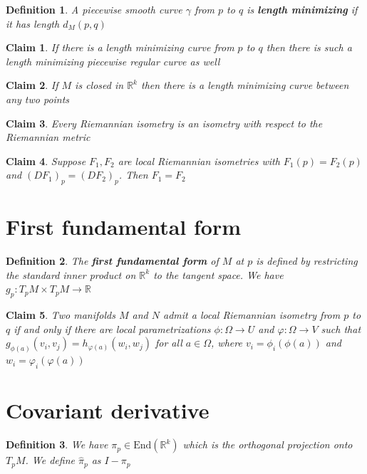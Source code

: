 \documentclass{article}
\newtheorem{definition}{Definition}
\newtheorem{claim}{Claim}
\begin{document}
\begin{definition}
    A piecewise smooth curve $\gamma$ from $p$ to $q$ is \textbf{length minimizing} if it has length $d_M(p,q)$
\end{definition}

\begin{claim}
    If there is a length minimizing curve from $p$ to $q$ then there is such a length minimizing piecewise regular curve as well 
\end{claim}

\begin{claim}
    If $M$ is closed in $\mathbb{R}^k$ then there is a length minimizing curve between any two points
\end{claim}

\begin{claim}
    Every Riemannian isometry is an isometry with respect to the Riemannian metric
\end{claim}

\begin{claim}
    Suppose $F_1,F_2$ are local Riemannian isometries with $F_1(p)=F_2(p)$ and $(DF_1)_p=(DF_2)_p$. Then $F_1=F_2$ 
\end{claim}

\section{First fundamental form}

\begin{definition}
    The \textbf{first fundamental form} of $M$ at $p$ is defined by restricting the standard inner product on $\mathbb{R}^k$ to the tangent space. We have $g_p: T_pM \times T_pM \to \mathbb{R}$
\end{definition}

\begin{claim}
    Two manifolds $M$ and $N$ admit a local Riemannian isometry from $p$ to $q$ if and only if there are local parametrizations $\phi: \Omega \to U$ and $\varphi : \Omega \to V$ such that $g_{\phi(a)}(v_i,v_j)=h_{\varphi(a)}(w_i,w_j)$ for all $a \in \Omega$, where $v_i = \phi_i(\phi(a))$ and $w_i = \varphi_i(\varphi(a))$ 
\end{claim}

\section{Covariant derivative}

\begin{definition}
    We have $\pi_p \in \text{End}(\mathbb{R}^k)$ which is the orthogonal projection onto $T_pM$. We define $\hat{\pi}_p$ as $I-\pi_p$
\end{definition}
\end{document}
